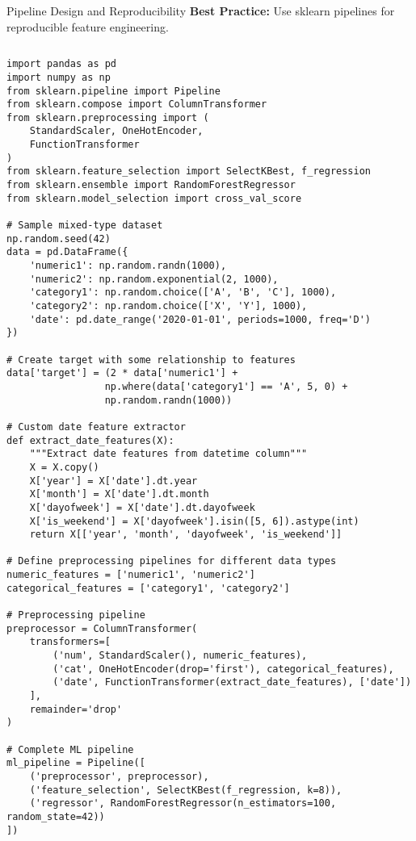 \documentclass[aspectratio=169,11pt]{beamer}
\begin{document}
\begin{frame}[fragile]{Pipeline Design and Reproducibility}
\textbf{Best Practice:} Use sklearn pipelines for reproducible feature engineering.

\begin{columns}
\begin{column}{0.6\textwidth}
\begin{lstlisting}
import pandas as pd
import numpy as np
from sklearn.pipeline import Pipeline
from sklearn.compose import ColumnTransformer
from sklearn.preprocessing import (
    StandardScaler, OneHotEncoder, 
    FunctionTransformer
)
from sklearn.feature_selection import SelectKBest, f_regression
from sklearn.ensemble import RandomForestRegressor
from sklearn.model_selection import cross_val_score

# Sample mixed-type dataset
np.random.seed(42)
data = pd.DataFrame({
    'numeric1': np.random.randn(1000),
    'numeric2': np.random.exponential(2, 1000),
    'category1': np.random.choice(['A', 'B', 'C'], 1000),
    'category2': np.random.choice(['X', 'Y'], 1000),
    'date': pd.date_range('2020-01-01', periods=1000, freq='D')
})

# Create target with some relationship to features
data['target'] = (2 * data['numeric1'] + 
                 np.where(data['category1'] == 'A', 5, 0) +
                 np.random.randn(1000))

# Custom date feature extractor
def extract_date_features(X):
    """Extract date features from datetime column"""
    X = X.copy()
    X['year'] = X['date'].dt.year
    X['month'] = X['date'].dt.month
    X['dayofweek'] = X['date'].dt.dayofweek
    X['is_weekend'] = X['dayofweek'].isin([5, 6]).astype(int)
    return X[['year', 'month', 'dayofweek', 'is_weekend']]

# Define preprocessing pipelines for different data types
numeric_features = ['numeric1', 'numeric2']
categorical_features = ['category1', 'category2']

# Preprocessing pipeline
preprocessor = ColumnTransformer(
    transformers=[
        ('num', StandardScaler(), numeric_features),
        ('cat', OneHotEncoder(drop='first'), categorical_features),
        ('date', FunctionTransformer(extract_date_features), ['date'])
    ],
    remainder='drop'
)

# Complete ML pipeline
ml_pipeline = Pipeline([
    ('preprocessor', preprocessor),
    ('feature_selection', SelectKBest(f_regression, k=8)),
    ('regressor', RandomForestRegressor(n_estimators=100, random_state=42))
])


\end{lstlisting}
\end{column}
\end{columns}
\end{frame}
\end{document}

